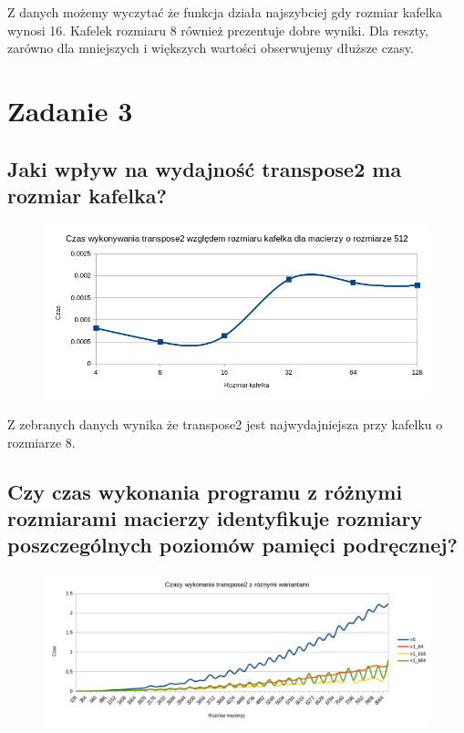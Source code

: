 \documentclass[a4paper,12pt]{mwart} %
\begin{document}
Z danych możemy wyczytać że funkcja działa najszybciej gdy rozmiar kafelka wynosi 16. Kafelek rozmiaru 8 również prezentuje dobre wyniki. Dla reszty, zarówno dla mniejszych i większych wartości obserwujemy dłuższe czasy.



\section*{Zadanie 3}

\subsection*{Jaki wpływ na wydajność transpose2 ma rozmiar kafelka?}

\begin{figure}[h!]
  \includegraphics[width=\linewidth]{graphs/graph3-1.png}
\end{figure}

Z zebranych danych wynika że transpose2 jest najwydajniejsza przy kafelku o rozmiarze 8.

\subsection*{Czy czas wykonania programu z różnymi rozmiarami macierzy identyfikuje rozmiary poszczególnych poziomów pamięci podręcznej?}

\begin{figure}[h!]
  \includegraphics[width=\linewidth]{graphs/graph3-2.png}
\end{figure}
\end{document}
